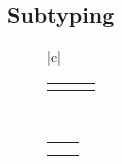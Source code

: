 \subsection{Subtyping}

\begin{figure}
  \begin{center}
    \def\arraystretch{2}
    \begin{tabular}{|c|}\hline
      \begin{tabular}{ccc}
        \AxiomC{$_A^B X^L, \Gamma\ \vdash\ T \leq S$}
        \UnaryInfC{$\Gamma\ \vdash\ \exists$ $_A^B X . T\ \leq\ S$}
        \DisplayProof

        \hspace{3ex}

        &

        \AxiomC{$_A^BX^R, \Gamma\ \vdash\ T \leq S$}
        \UnaryInfC{$\Gamma\ \vdash\ T\ \leq\ \exists$ $_A^B X . S$}
        \DisplayProof

        \hspace{3ex}

        &

        \AxiomC{}
        \UnaryInfC{$\Gamma\ \vdash\ X \leq X$}
        \DisplayProof
      \end{tabular}

      \\[8pt]

      \begin{tabular}{cc}
        \AxiomC{$^BX^L,\Gamma\ \vdash\ B \leq T$}
        \UnaryInfC{$^BX^L,\Gamma\ \vdash\ X \leq T$}
        \DisplayProof

        \hspace{3ex}

        &

        \AxiomC{$_AX^L,\Gamma\ \vdash\ T \leq A$}
        \UnaryInfC{$_AX^L,\Gamma\ \vdash\ T \leq X$}
        \DisplayProof

        \hspace{3ex}

        \\[8pt]

        \AxiomC{$^BX^L,{} _AY^L,\Gamma\ \vdash\ B \leq Y\ \vee\ X \leq A$}
        \UnaryInfC{$^BX^L,{} _AY^L,\Gamma\ \vdash\ X \leq Y$}
        \DisplayProof

        \hspace{4ex}

        &

        \AxiomC{$_A^BX^R,{} Y^R,\Gamma\ \vdash\ B \leq A$}
        \UnaryInfC{$_A^BX^R,{} Y^R,\Gamma\ \vdash\ X \leq Y$}
        \DisplayProof


\end{tabular}
\end{tabular}
\end{center}
\end{figure}
